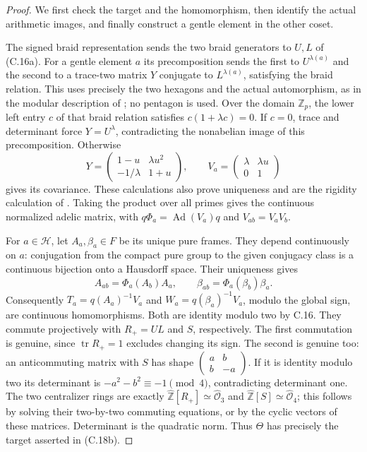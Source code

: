 \begin{proof}
We first check the target and the homomorphism, then
identify the actual arithmetic images, and finally
construct a gentle element in the other coset.

The signed braid representation sends the two braid
generators to \(U,L\) of (C.16a). For a gentle element
\(a\) its precomposition sends the first to
\(U^{\lambda(a)}\) and the second to a trace-two
matrix \(Y\) conjugate to \(L^{\lambda(a)}\), satisfying
the braid relation. This uses precisely the two
hexagons and the actual automorphism, as in the modular
description of \citet{cHarbaterSchneps2000}; no pentagon
is used. Over the domain \(\mathbb Z_p\), the lower
left entry \(c\) of that braid relation satisfies
\(c(1+\lambda c)=0\).
If \(c=0\), trace and determinant force
\(Y=U^\lambda\), contradicting the nonabelian image
of this precomposition. Otherwise
\[
 Y=\begin{pmatrix}1-u&\lambda u^2\\
                   -1/\lambda&1+u\end{pmatrix},\qquad
 V_a=\begin{pmatrix}\lambda&\lambda u\\0&1\end{pmatrix}
 \tag{C.18e}
\]
gives its covariance. These calculations also prove
uniqueness and are the rigidity calculation of
\citet[Lemmas 4.1--4.3]{cMarin2008}.
Taking the product over all primes gives the continuous
normalized adelic matrix, with
\(q\Phi_a=\operatorname{Ad}(V_a)q\) and
\(V_{ab}=V_aV_b\).

For \(a\in\mathcal H\), let \(A_a,\beta_a\in F\)
be its unique pure frames. They depend continuously on
\(a\): conjugation from the compact pure group to the
given conjugacy class is a continuous bijection onto
a Hausdorff space. Their uniqueness gives
\[
 A_{ab}=\Phi_a(A_b)A_a,\qquad
 \beta_{ab}=\Phi_a(\beta_b)\beta_a.
 \tag{C.18f}
\]
Consequently
\(T_a=q(A_a)^{-1}V_a\) and
\(W_a=q(\beta_a)^{-1}V_a\), modulo the global sign,
are continuous homomorphisms.
Both are identity modulo two by C.16. They commute
projectively with \(R_+=UL\) and \(S\), respectively.
The first commutation is genuine, since
\(\operatorname{tr}R_+=1\) excludes changing its sign.
The second is genuine too: an anticommuting matrix
with \(S\) has shape
\(\left(\begin{smallmatrix}a&b\\b&-a\end{smallmatrix}\right)\).
If it is identity modulo two its determinant is
\(-a^2-b^2\equiv-1\pmod4\), contradicting determinant
one. The two centralizer rings are exactly
\(\widehat{\mathbb Z}[R_+]\simeq\widehat{\mathcal O}_3\)
and \(\widehat{\mathbb Z}[S]\simeq\widehat{\mathcal O}_4\);
this follows by solving their two-by-two commuting
equations, or by the cyclic vectors of these matrices.
Determinant is the quadratic norm. Thus \(\Theta\)
has precisely the target asserted in (C.18b).


\end{proof}

